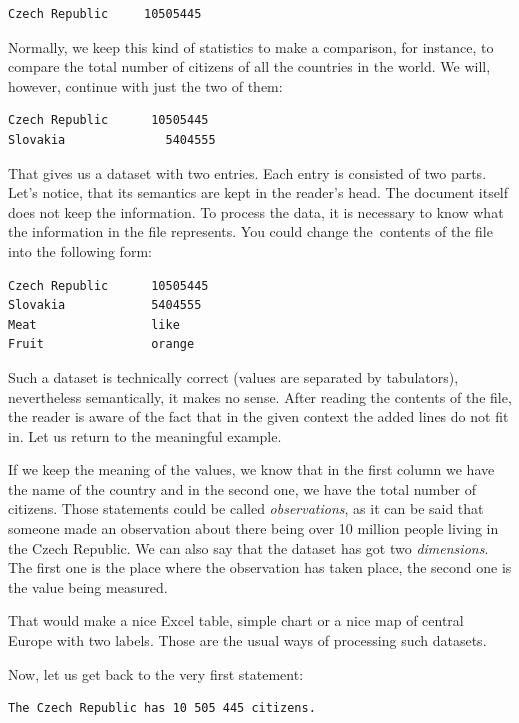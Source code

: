 \begin{verbatim}
Czech Republic     10505445
\end{verbatim}

Normally, we keep this kind of statistics to make a comparison, 
for instance, to compare the total number of citizens of all the countries in the world.
We will, however, continue with just the two of them:

\begin{verbatim}
Czech Republic	    10505445
Slovakia	          5404555
\end{verbatim}

That gives us a dataset with two entries. Each entry is consisted of two parts. Let’s notice, that 
its semantics are kept in the reader's head. The document itself does not keep the information.
To process the data, it is necessary to know what the information in the file represents. You could change
the~contents of the file into the following form:

\begin{verbatim}
Czech Republic      10505445
Slovakia            5404555
Meat                like
Fruit               orange
\end{verbatim}

Such a dataset is technically correct (values are separated by tabulators), nevertheless 
semantically, it makes no sense. After reading the contents of the file, the reader 
is aware of the fact that in the given context the added lines do not fit in.
Let us return to the meaningful example.

If we keep the meaning of the values, we know that in the first column we have the name
of the country and in the second one, we have the total number of citizens. Those statements
could be called \emph{observations}, as it can be said that someone made an observation 
about there being over 10 million people living in the Czech Republic. We can also say that the
dataset has got two \emph{dimensions}. The first one is the place where the observation has taken
place, the second one is the value being measured.

That would make a nice Excel table, simple chart or a nice map of central Europe with
two labels. Those are the usual ways of processing such datasets.

Now, let us get back to the very first statement:

\begin{verbatim}
The Czech Republic has 10 505 445 citizens.
\end{verbatim}

